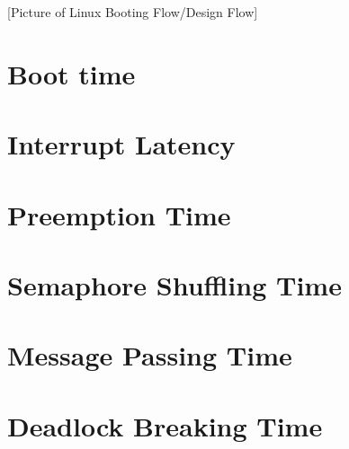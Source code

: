 [Picture of Linux Booting Flow/Design Flow]
  


\section{Boot time}
\section{Interrupt Latency}
\section{Preemption Time}
\section{Semaphore Shuffling Time}
\section{Message Passing Time}
\section{Deadlock Breaking Time}